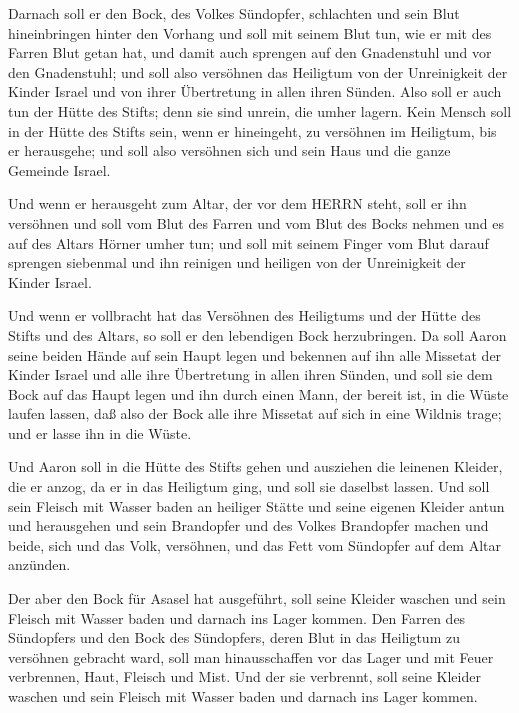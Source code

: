  Darnach soll er den Bock, des Volkes Sündopfer, schlachten
und sein Blut hineinbringen hinter den Vorhang und soll mit seinem Blut
tun, wie er mit des Farren Blut getan hat, und damit auch sprengen auf
den Gnadenstuhl und vor den Gnadenstuhl;  und soll also
versöhnen das Heiligtum von der Unreinigkeit der Kinder Israel und von
ihrer Übertretung in allen ihren Sünden. Also soll er auch tun der Hütte
des Stifts; denn sie sind unrein, die umher lagern.  Kein
Mensch soll in der Hütte des Stifts sein, wenn er hineingeht, zu
versöhnen im Heiligtum, bis er herausgehe; und soll also versöhnen sich
und sein Haus und die ganze Gemeinde Israel.

 Und wenn er herausgeht zum Altar, der vor dem HERRN steht,
soll er ihn versöhnen und soll vom Blut des Farren und vom Blut des
Bocks nehmen und es auf des Altars Hörner umher tun;  und
soll mit seinem Finger vom Blut darauf sprengen siebenmal und ihn
reinigen und heiligen von der Unreinigkeit der Kinder Israel.

 Und wenn er vollbracht hat das Versöhnen des Heiligtums
und der Hütte des Stifts und des Altars, so soll er den lebendigen Bock
herzubringen.  Da soll Aaron seine beiden Hände auf sein
Haupt legen und bekennen auf ihn alle Missetat der Kinder Israel und
alle ihre Übertretung in allen ihren Sünden, und soll sie dem Bock auf
das Haupt legen und ihn durch einen Mann, der bereit ist, in die Wüste
laufen lassen,  daß also der Bock alle ihre Missetat auf
sich in eine Wildnis trage; und er lasse ihn in die Wüste.

 Und Aaron soll in die Hütte des Stifts gehen und ausziehen
die leinenen Kleider, die er anzog, da er in das Heiligtum ging, und
soll sie daselbst lassen.  Und soll sein Fleisch mit Wasser
baden an heiliger Stätte und seine eigenen Kleider antun und herausgehen
und sein Brandopfer und des Volkes Brandopfer machen und beide, sich und
das Volk, versöhnen,  und das Fett vom Sündopfer auf dem
Altar anzünden.

 Der aber den Bock für Asasel hat ausgeführt, soll seine
Kleider waschen und sein Fleisch mit Wasser baden und darnach ins Lager
kommen.  Den Farren des Sündopfers und den Bock des
Sündopfers, deren Blut in das Heiligtum zu versöhnen gebracht ward, soll
man hinausschaffen vor das Lager und mit Feuer verbrennen, Haut, Fleisch
und Mist.  Und der sie verbrennt, soll seine Kleider
waschen und sein Fleisch mit Wasser baden und darnach ins Lager kommen.

